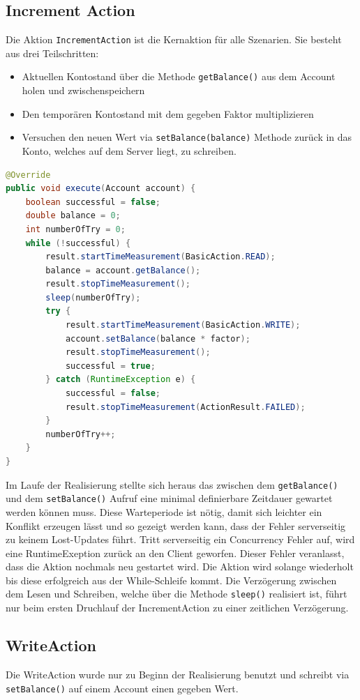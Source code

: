  
\subsection{Increment Action}
\label{sec:incrementAction}
Die Aktion \verb+IncrementAction+ ist die Kernaktion für alle Szenarien. Sie besteht aus drei Teilschritten:
\begin{itemize}
\item Aktuellen Kontostand über die Methode \verb+getBalance()+ aus dem Account holen und zwischenspeichern
\item Den temporären Kontostand mit dem gegeben Faktor multiplizieren
\item Versuchen den neuen Wert via \verb+setBalance(balance)+ Methode zurück in das Konto, welches auf dem Server liegt, zu schreiben. 
\end{itemize}

\begin{lstlisting}[language=java, breaklines=true] 
@Override
public void execute(Account account) {
	boolean successful = false;
	double balance = 0;
	int numberOfTry = 0;
	while (!successful) {
		result.startTimeMeasurement(BasicAction.READ);
		balance = account.getBalance();
		result.stopTimeMeasurement();
		sleep(numberOfTry);
		try {
			result.startTimeMeasurement(BasicAction.WRITE);
			account.setBalance(balance * factor);
			result.stopTimeMeasurement();
			successful = true;
		} catch (RuntimeException e) {
			successful = false;
			result.stopTimeMeasurement(ActionResult.FAILED);
		}
		numberOfTry++;
	}
}
\end{lstlisting}
Im Laufe der Rea\-li\-sie\-rung stellte sich her\-aus das zwi\-schen dem \verb+getBalance()+ und dem \verb+setBalance()+ Auf\-ruf eine mi\-ni\-mal de\-fi\-nier\-ba\-re Zeit\-dauer ge\-wartet werden können muss. Diese Warteperiode ist nötig, damit sich leichter ein Konflikt erzeugen lässt und so gezeigt werden kann, dass der Fehler serverseitig zu keinem Lost-Updates führt. Tritt serverseitig ein Concurrency Fehler auf, wird eine RuntimeExeption zurück an den Client geworfen. Dieser Fehler veranlasst, dass die Aktion nochmals neu gestartet wird. Die Aktion wird solange wiederholt bis diese erfolgreich aus der While-Schleife kommt. Die Verzögerung zwischen dem Lesen und Schreiben, welche über die Methode \verb+sleep()+ realisiert ist, führt nur beim ersten Druchlauf der IncrementAction zu einer zeitlichen Verzögerung.

\subsection{WriteAction}
\label{sec:writeAction}
Die WriteAction wurde nur zu Beginn der Realisierung benutzt und schreibt via \verb+setBalance()+ auf einem Account einen gegeben Wert. 

